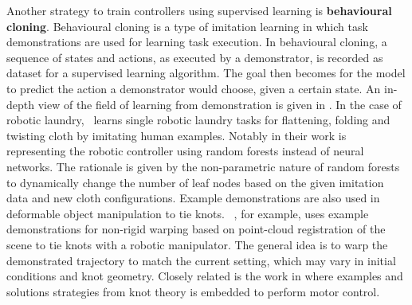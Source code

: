 \documentclass[\home/main.tex]{subfiles}
\begin{document}
Another strategy to train controllers using supervised learning is \textbf{behavioural cloning}. Behavioural cloning is a type of imitation learning \autocite{Argall2009} in which task demonstrations are used for learning task execution. In behavioural cloning, a sequence of states and actions, as executed by a demonstrator, is recorded as dataset for a supervised learning algorithm. The goal then becomes for the model to predict the action a demonstrator would choose, given a certain state. 
An in-depth view of the field of learning from demonstration is given in \autocite{Argall2009}. In the case of robotic laundry,~\textcite{Jia2019} learns single robotic laundry tasks for flattening, folding and twisting cloth by imitating human examples. Notably in their work is representing the robotic controller using random forests \autocite{Breiman2001} instead of neural networks. The rationale is given by the non-parametric nature of random forests to dynamically change the number of leaf nodes based on the given imitation data and new cloth configurations.
Example demonstrations are also used in deformable object manipulation to tie knots. ~\textcite{Schulman2016learning}, for example, uses example demonstrations for non-rigid warping \autocite{Chui2003} based on point-cloud registration of the scene to tie knots with a robotic manipulator. The general idea is to warp the demonstrated trajectory to match the current setting, which may vary in initial conditions and knot geometry. Closely related is the work in \autocite{Morita2003} where examples and solutions strategies from knot theory is embedded to perform motor control.
\end{document}
